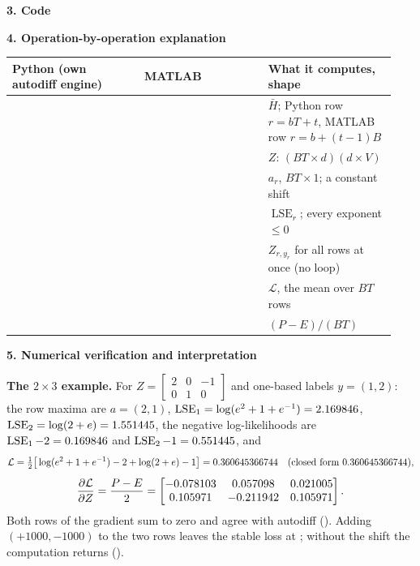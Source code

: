 \documentclass[11pt,a4paper]{article}
\makeatletter
\numberwithin{equation}{section}
\newcommand{\LSE}{\operatorname{LSE}}
\newcommand{\Hbar}{\bar H}
\DeclareRobustCommand{\code}[1]{\texttt{\detokenize{#1}}}
\newenvironment{ops}{\par\small\renewcommand{\arraystretch}{1.18}%
  \begin{longtable}{@{}>{\raggedright\arraybackslash}p{0.325\linewidth}>{\raggedright\arraybackslash}p{0.30\linewidth}>{\raggedright\arraybackslash}p{0.315\linewidth}@{}}
  \toprule \textbf{Python (own autodiff engine)} & \textbf{MATLAB} & \textbf{What it computes, shape}\\ \midrule\endhead}
  {\bottomrule\end{longtable}\vspace{-0.6em}}
\newcommand{\stephead}[1]{\par\smallskip\noindent\textbf{\small #1}\par\nobreak}
\makeatother
\begin{document}
\stephead{3. Code}





\stephead{4. Operation-by-operation explanation}
\begin{ops}
\code{Hf.reshape(B * T, d)} & \code{reshape(Hf, B*T, d)} & $\Hbar$; Python row $r=bT+t$, MATLAB row $r=b+(t-1)B$\\
\code{Hbar @ P["W_voc"]} & \code{Hbar * P.W_voc} & $Z$: $(BT\times d)(d\times V)$\\
\code{Z.max(axis=1, keepdims=True)} & \code{max(Z, [], 2)} & $a_r$, $BT\times1$; a constant shift\\
\code{a + ops.log((Z - a).exp().sum(axis=1, keepdims=True))} & \code{a + log(sum(exp(Z - a), 2))} & $\LSE_r$; every exponent $\le0$\\
\code{ops.pick(Z, y)} & \code{Z(sub2ind(size(Z), (1:R)', y(:)))} & $Z_{r,y_r}$ for all rows at once (no loop)\\
\code{(lse - picked).mean()} & \code{mean(lse - Z(idx))} & $\mathcal L$, the mean over $BT$ rows\\
\code{G[np.arange(R), y] -= 1; G / R} & \code{G(idx) = G(idx) - 1; G / R} & $(P-E)/(BT)$\\
\end{ops}

\stephead{5. Numerical verification and interpretation}
\textbf{The $2\times3$ example.} For $Z=\begin{bmatrix}2&0&-1\\0&1&0\end{bmatrix}$ and one-based labels $y=(1,2)$: the row maxima
are $a=(2,1)$, $\LSE_1=\log(e^2+1+e^{-1})=\CEexLSEa$, $\LSE_2=\log(2+e)=\CEexLSEb$, the negative log-likelihoods are
$\LSE_1-2=\CEexNLLa$ and $\LSE_2-1=\CEexNLLb$, and
\[
\mathcal L=\tfrac12\big[\log(e^2+1+e^{-1})-2+\log(2+e)-1\big]=0.360645366744\quad(\text{closed form }0.360645366744),
\]
\[
\frac{\partial\mathcal L}{\partial Z}=\frac{P-E}{2}=\begin{bmatrix}-0.078103 & 0.057098 & 0.021005 \\ 0.105971 & -0.211942 & 0.105971\end{bmatrix} .
\]
Both rows of the gradient sum to zero and agree with autodiff (\code{Q2.2}). Adding $(+1000,-1000)$ to the two rows leaves the
stable loss at \ShiftStable{}; without the shift the computation returns \ShiftNaive{} (\code{Q2.3}).
\end{document}

